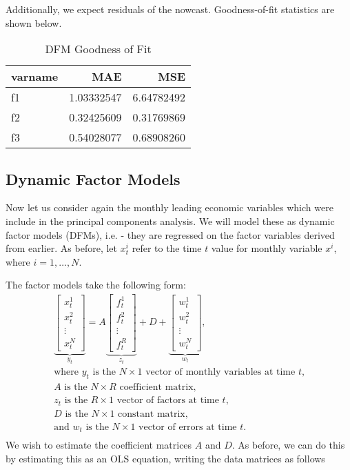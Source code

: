 \documentclass[11pt, letterpaper]{article}\usepackage[]{graphicx}\usepackage[]{color}
\begin{document}
Additionally, we expect residuals of the nowcast. Goodness-of-fit statistics are shown below.
\begin{table}[H]
\centering
\begingroup\footnotesize
\begin{tabular}{lrr}
  \hline
varname & MAE & MSE \\ 
  \hline
f1 & 1.03332547 & 6.64782492 \\ 
  f2 & 0.32425609 & 0.31769869 \\ 
  f3 & 0.54028077 & 0.68908260 \\ 
   \hline
\end{tabular}
\endgroup
\caption{DFM Goodness of Fit} 
\end{table}




\subsection{Dynamic Factor Models}
Now let us consider again the monthly leading economic variables which were include in the principal components analysis. We will model these as dynamic factor models (DFMs), i.e. - they are regressed on the factor variables derived from earlier. As before, let $x^i_t$ refer to the time $t$ value for monthly variable $x^i$, where $i = 1, \dots, N$.

The factor models take the following form:
\begin{align*}
\underbrace{\begin{bmatrix}
	x^1_t\\
	x^2_t\\
	\vdots \\
	x^N_t
\end{bmatrix}}_{y_t}
=
A
\underbrace{\begin{bmatrix}
	f^1_{t}\\
	f^2_{t}\\
	\vdots \\
	f^R_{t}
\end{bmatrix}}_{z_t}
+
D 
+
\underbrace{\begin{bmatrix}
	w^1_t\\
	w^2_t\\
	\vdots\\
	w^N_t
\end{bmatrix}}_{w_t},\\
\text{where $y_t$ is the $N \times 1$ vector of monthly variables at time $t$,}\\
\text{$A$ is the $N \times R$ coefficient matrix,}\\
\text{$z_t$ is the $R \times 1$ vector of factors at time $t$,}\\
\text{$D$ is the $N \times 1$ constant matrix,}\\
\text{and $w_t$ is the $N \times 1$ vector of errors at time $t$.}\\
\end{align*}
We wish to estimate the coefficient matrices $A$ and $D$. As before, we can do this by estimating this as an OLS equation, writing the data matrices as follows
\end{document}
